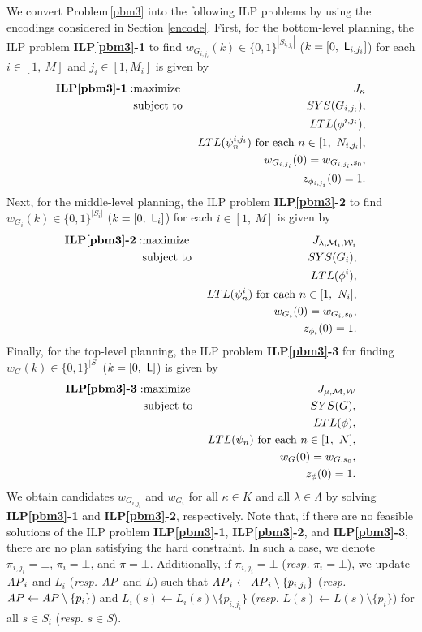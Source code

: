 \documentclass[journal,twoside,web]{IEEEtran}
\newcommand{\rpbm}[1]{Problem\,\ref{#1}}
\newcommand{\AP}{{\textit AP}}
\newcommand{\Len}{{\sf L}}
\newcommand{\M}{\mathcal{M}}
\newcommand{\W}{\mathcal{W}}
\begin{document}
We convert \rpbm{pbm3} into the following ILP problems by using the encodings considered in Section \ref{encode}. 
First, for the bottom-level planning, the ILP problem {\bf ILP\ref{pbm3}-1} to find $w_{G_{i,j_i}}(k)\in\{0,1\}^{|S_{i,j_i}|}$ ($k=[0,~\Len_{i,j_i}]$) for each $i\in[1,~M]$ and $j_i \in [1,M_i]$ is given by
%
\begin{eqnarray}
\mbox{\bf ILP\ref{pbm3}-1}: &\mbox{maximize }&J_\kappa \notag \\
&\mbox{subject to }&SYS(G_{i,j_i}), \notag \\
&& LTL(\phi^{i,j_i}),\notag \\
&& LTL(\psi^{i,j_i}_n) \  {\rm{for\ each\ }}  n \in [1,\ N_{i,j_i}], \notag\\
&& w_{G_{i,j_i}}(0)=w_{G_{i,j_i},s_0}, \notag \\
&&z_{\phi_{i,j_i}} (0) = 1. \notag
\end{eqnarray}
Next, for the middle-level planning, the ILP problem {\bf ILP\ref{pbm3}-2} to find $w_{G_i}(k)\in\{0,1\}^{|S_i|}$ ($k=[0,~\Len_i]$) for each $i\in[1,~M]$ is given by
\begin{eqnarray}
\mbox{\bf ILP\ref{pbm3}-2}: 
&\mbox{maximize }&J_{\lambda,\M_i,\W_i} \notag \\
&\mbox{subject to }&SYS(G_i), \notag \\
&& LTL(\phi^i),\notag \\
&& LTL(\psi^{i}_n) \  {\rm{for\ each\ }}  n \in [1,\ N_i], \notag\\
&& w_{G_i}(0)=w_{G_i,s_0}, \notag \\
&&z_{\phi_i} (0) = 1. \notag
\end{eqnarray}
%
Finally, for the top-level planning, the ILP problem {\bf ILP\ref{pbm3}-3} for finding $w_G(k)\in\{0,1\}^{|S|}$ ($k=[0,~\Len]$) is given by
%
\begin{eqnarray}
\mbox{\bf ILP\ref{pbm3}-3}: 
&\mbox{maximize }&J_{\mu,\M,\W} \notag \\
&\mbox{subject to }&SYS(G), \notag \\
&& LTL(\phi),\notag \\
&& LTL(\psi_n) \  {\rm{for\ each\ }}  n \in [1,\ N], \notag\\
&& w_G(0)=w_{G,s_0}, \notag \\
&&z_{\phi} (0) = 1. \notag
\end{eqnarray}
%
We obtain candidates $w_{G_{i,j_i}}$ and $w_{G_i}$ for all $\kappa\in K$ and all $\lambda\in \Lambda$ by solving {\bf ILP\ref{pbm3}-1} and {\bf ILP\ref{pbm3}-2}, respectively.
Note that, if there are no feasible solutions of the ILP problem {\bf ILP\ref{pbm3}-1}, {\bf ILP\ref{pbm3}-2}, and {\bf ILP\ref{pbm3}-3}, there are no plan satisfying the hard constraint.  In such a case, we denote $\pi_{i,j_i}=\bot$, $\pi_i=\bot$, and $\pi=\bot$.
Additionally, if $\pi_{i,j_i}=\bot$ ({\sl resp.} $\pi_{i}=\bot$), we update $\AP_i$ and $L_i$ ({\sl resp.} $\AP$ and $L$) such that $\AP_i\leftarrow \AP_i\setminus \{p_{i,j_i}\}$ ({\sl resp.} $\AP\leftarrow \AP\setminus \{p_{i}\}$) and $L_i(s)\leftarrow L_i(s)\setminus \{p_{i,j_i}\}$ ({\sl resp.} $L(s)\leftarrow L(s)\setminus \{p_{i}\}$) for all $s\in S_{i}$ ({\sl resp.} $s\in S$).
\end{document}
